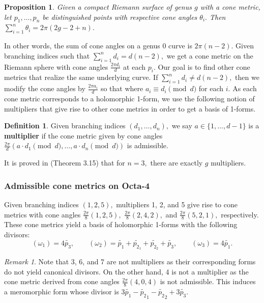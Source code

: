 \documentclass[12pt,reqno]{amsart}
\newtheorem*{proposition}{Proposition}
\theoremstyle{definition}
\newtheorem{defn}{Definition}
\theoremstyle{remark}
\newtheorem*{remark}{Remark}
\begin{document}
\begin{proposition} Given a compact Riemann surface of genus $g$ with a cone metric, let $p_1, \ldots, p_n$ be distinguished points with respective cone angles $\theta_i.$ Then $\sum\limits_{i=1}^n \theta_i = 2 \pi (2 g - 2 + n).$
\end{proposition}


In other words, the sum of cone angles on a genus 0 curve is $2 \pi (n - 2).$ Given branching indices such that $\sum\limits_{i=1}^n d_i = d (n - 2),$ we get a cone metric on the Riemann sphere with cone angles $\frac{2 \pi d_i}{d}$ at each $p_i.$ Our goal is to find other cone metrics that realize the same underlying curve. If $\sum\limits_{i=1}^n d_i \neq d (n - 2),$ then we modify the cone angles by $\frac{2 \pi a_i}{d}$ so that where $a_i \equiv d_i \pmod d$ for each $i.$ As each cone metric corresponds to a holomorphic 1-form, we use the following notion of multipliers that give rise to other cone metrics in order to get a basis of 1-forms.

\begin{defn} Given branching indices $(d_1, \ldots , d_n),$ we say $a \in \{1, \ldots, d - 1\}$ is a \textbf{multiplier} if the cone metric given by cone angles $\frac{2 \pi}{d} (a \cdot d_1 \pmod d, \ldots , a \cdot d_n \pmod d)$ is admissible. 
\end{defn}

It is proved in \cite{dthesis} (Theorem 3.15) that for $n = 3,$ there are exactly $g$ multipliers. 

\subsubsection*{Admissible cone metrics on Octa-4} Given branching indices $(1, 2, 5),$ multipliers 1, 2, and 5 give rise to cone metrics with cone angles $\frac{2 \pi}{8}(1, 2, 5),$ $\frac{2 \pi}{8}(2, 4, 2),$ and $\frac{2 \pi}{8}(5, 2, 1),$ respectively. These cone metrics yield a basis of holomorphic 1-forms with the following divisors: $$(\omega_1) = 4 \widetilde{p_3}, \qquad (\omega_2) = \widetilde{p_1} + \widetilde{p_{2_1}} + \widetilde{p_{2_2}} + \widetilde{p_3}, \qquad (\omega_3) = 4 \widetilde{p_1}.$$

\begin{remark} Note that 3, 6, and 7 are not multipliers as their corresponding forms do not yield canonical divisors. On the other hand, 4 is not a multiplier as the cone metric derived from cone angles $\frac{2 \pi}{8} (4, 0, 4)$ is not admissible. This induces a meromorphic form whose divisor is $3 \widetilde{p_1} - \widetilde{p_2}_1 - \widetilde{p_2}_2 + 3 \widetilde{p_3}.$ \end{remark}
\end{document}
